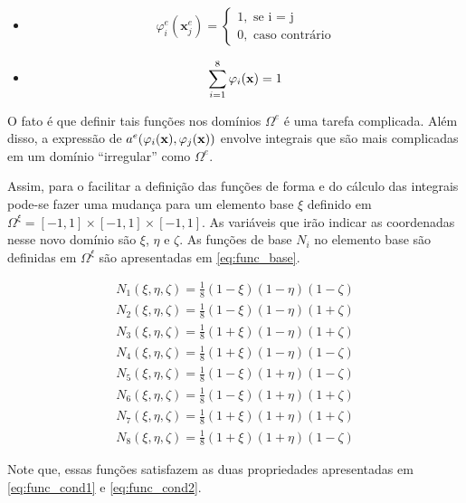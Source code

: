 \begin{itemize}
\item \begin{equation}\label{eq:func_cond1}
\varphi^e_i(\mathbf{x}^e_j) = \left\{\begin{matrix} 1, \text{ se i = j} \\  0, \text{ caso contrário} \end{matrix}\right.
\end{equation}
\item \begin{equation}\label{eq:func_cond2}
    \sum_{i=1}^8 \varphi_i(\mathbf{x}) = 1
\end{equation}
\end{itemize}


O fato é que definir tais funções nos domínios $\Omega^e$ é uma tarefa complicada. Além disso, a expressão de $a^e(\varphi_i(\mathbf{x}),\varphi_j(\mathbf{x}))$ envolve integrais que são mais complicadas em um domínio {\color{red}``irregular''} como $\Omega^e$.


Assim, para o facilitar a definição das funções de forma e do cálculo das integrais pode-se fazer uma mudança para um elemento base $\xi$ definido em $\Omega^\xi = [-1,1]\times[-1,1]\times[-1,1]$. As variáveis que irão indicar as coordenadas nesse novo domínio são $\xi$, $\eta$ e $\zeta$. As funções de base $N_i$ no elemento base são definidas em $\Omega^\xi$ são apresentadas em \ref{eq:func_base}.

\begin{equation}
\begin{matrix}\label{eq:func_base}
N_1(\xi, \eta, \zeta) = \frac{1}{8} (1-\xi)(1-\eta)(1-\zeta) \\
N_2(\xi, \eta, \zeta) = \frac{1}{8} (1-\xi)(1-\eta)(1+\zeta) \\
N_3(\xi, \eta, \zeta) = \frac{1}{8} (1+\xi)(1-\eta)(1+\zeta) \\
N_4(\xi, \eta, \zeta) = \frac{1}{8} (1+\xi)(1-\eta)(1-\zeta) \\
N_5(\xi, \eta, \zeta) = \frac{1}{8} (1-\xi)(1+\eta)(1-\zeta) \\
N_6(\xi, \eta, \zeta) = \frac{1}{8} (1-\xi)(1+\eta)(1+\zeta) \\
N_7(\xi, \eta, \zeta) = \frac{1}{8} (1+\xi)(1+\eta)(1+\zeta) \\
N_8(\xi, \eta, \zeta) = \frac{1}{8} (1+\xi)(1+\eta)(1-\zeta)
\end{matrix}
\end{equation}

Note que, essas funções satisfazem as duas propriedades apresentadas em \ref{eq:func_cond1} e \ref{eq:func_cond2}.


